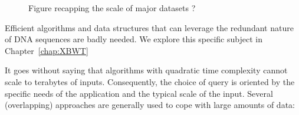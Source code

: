 \begin{figure}
    \begin{center}
        \caption{Figure recapping the scale of major datasets ?}
        \label{fig:intro:scalability}
    \end{center}
\end{figure}

Efficient algorithms and data structures that can leverage the redundant nature of DNA sequences are badly needed. We explore this specific subject in Chapter~\ref{chap:XBWT}

It goes without saying that algorithms with quadratic time complexity cannot scale to terabytes of inputs. Consequently, the choice of query is oriented by the specific needs of the application and the typical scale of the input.
Several (overlapping) approaches are generally used to cope with large amounts of data:

